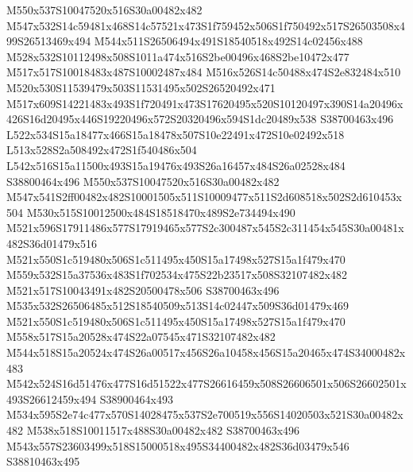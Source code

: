 \documentclass{article}
\begin{document}
\begin{multicols}{2}





M550x537S10047520x516S30a00482x482 M547x532S14c59481x468S14c57521x473S1f759452x506S1f750492x517S26503508x499S26513469x494 M544x511S26506494x491S18540518x492S14c02456x488 M528x532S10112498x508S1011a474x516S2be00496x468S2be10472x477 M517x517S10018483x487S10002487x484 M516x526S14c50488x474S2e832484x510 M520x530S11539479x503S11531495x502S26520492x471 M517x609S14221483x493S1f720491x473S17620495x520S10120497x390S14a20496x426S16d20495x446S19220496x572S20320496x594S1dc20489x538 S38700463x496 L522x534S15a18477x466S15a18478x507S10e22491x472S10e02492x518 L513x528S2a508492x472S1f540486x504 L542x516S15a11500x493S15a19476x493S26a16457x484S26a02528x484 S38800464x496 M550x537S10047520x516S30a00482x482 M547x541S2ff00482x482S10001505x511S10009477x511S2d608518x502S2d610453x504 M530x515S10012500x484S18518470x489S2e734494x490 M521x596S17911486x577S17919465x577S2c300487x545S2c311454x545S30a00481x482S36d01479x516 M521x550S1c519480x506S1c511495x450S15a17498x527S15a1f479x470 M559x532S15a37536x483S1f702534x475S22b23517x508S32107482x482 M521x517S10043491x482S20500478x506 S38700463x496 M535x532S26506485x512S18540509x513S14c02447x509S36d01479x469 M521x550S1c519480x506S1c511495x450S15a17498x527S15a1f479x470 M558x517S15a20528x474S22a07545x471S32107482x482 M544x518S15a20524x474S26a00517x456S26a10458x456S15a20465x474S34000482x483 M542x524S16d51476x477S16d51522x477S26616459x508S26606501x506S26602501x493S26612459x494 S38900464x493 M534x595S2e74c477x570S14028475x537S2e700519x556S14020503x521S30a00482x482 M538x518S10011517x488S30a00482x482 S38700463x496 M543x557S23603499x518S15000518x495S34400482x482S36d03479x546 S38810463x495


\end{multicols}
\end{document}
